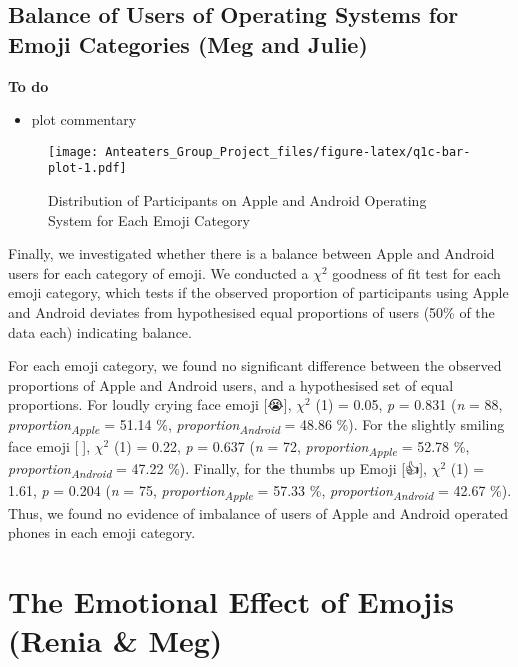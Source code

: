 \documentclass[
]{article}
\providecommand{\tightlist}{%
  \setlength{\itemsep}{0pt}\setlength{\parskip}{0pt}}
\begin{document}
\hypertarget{balance-of-users-of-operating-systems-for-emoji-categories-meg-and-julie}{%
\subsection{Balance of Users of Operating Systems for Emoji Categories (Meg and Julie)}\label{balance-of-users-of-operating-systems-for-emoji-categories-meg-and-julie}}

\textbf{To do}

\begin{itemize}
\tightlist
\item
  plot commentary
\end{itemize}

\begin{figure}
\centering
\texttt{[image: Anteaters\_Group\_Project\_files/figure-latex/q1c-bar-plot-1.pdf]}
\caption{\label{fig:q1c-bar-plot}Distribution of Participants on Apple and Android Operating System for Each Emoji Category}
\end{figure}

Finally, we investigated whether there is a balance between Apple and Android users for each category of emoji. We conducted a \(\chi^2\) goodness of fit test for each emoji category, which tests if the observed proportion of participants using Apple and Android deviates from hypothesised equal proportions of users (50\% of the data each) indicating balance.

For each emoji category, we found no significant difference between the observed proportions of Apple and Android users, and a hypothesised set of equal proportions. For loudly crying face emoji {[}😭{]}, \(\chi^2\) (1) = 0.05, \emph{p} = 0.831 (\emph{n} = 88, \emph{proportion\textsubscript{Apple}} = 51.14 \%, \emph{proportion\textsubscript{Android}} = 48.86 \%). For the slightly smiling face emoji {[}🙂{]}, \(\chi^2\) (1) = 0.22, \emph{p} = 0.637 (\emph{n} = 72, \emph{proportion\textsubscript{Apple}} = 52.78 \%, \emph{proportion\textsubscript{Android}} = 47.22 \%). Finally, for the thumbs up Emoji {[}👍{]}, \(\chi^2\) (1) = 1.61, \emph{p} = 0.204 (\emph{n} = 75, \emph{proportion\textsubscript{Apple}} = 57.33 \%, \emph{proportion\textsubscript{Android}} = 42.67 \%). Thus, we found no evidence of imbalance of users of Apple and Android operated phones in each emoji category.

\hypertarget{the-emotional-effect-of-emojis-renia-meg}{%
\section{The Emotional Effect of Emojis (Renia \& Meg)}\label{the-emotional-effect-of-emojis-renia-meg}}
\end{document}
